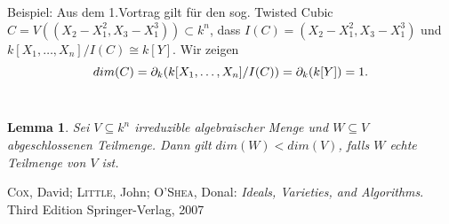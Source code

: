 \documentclass{article}
\newtheorem{lemma}[satz]{Lemma}
\newcommand*{\R}{k[X_{1},\ldots,X_{n}]}
\newcommand*{\indx}[2]{{#1}_{#2}}
\begin{document}
Beispiel: Aus dem 1.Vortrag gilt für den sog. Twisted Cubic $C=V((\indx{X}{2}-\indx{X}{1}^2,\indx{X}{3}-\indx{X}{1}^3))\subset k^n$, dass $I(C)=(\indx{X}{2}-\indx{X}{1}^2,\indx{X}{3}-\indx{X}{1}^3)$ und $\R/I(C)\cong k[Y]$. Wir zeigen
\begin{displaymath}
dim(C)=\indx{\partial}{k}(\R/I(C))=\indx{\partial}{k}(k[Y])=1.\\
\end{displaymath} 
\\

\begin{lemma}
	Sei $V\subseteq k^n$ irreduzible algebraischer Menge und $W\subseteq V$ abgeschlossenen Teilmenge. Dann gilt $dim(W)<dim(V)$, falls $W$ echte Teilmenge von $V$ ist.
\end{lemma} 


\begin{thebibliography}{99}
	\textsc{Cox}, David; \textsc{Little}, John; \textsc{O'Shea}, Donal:
	\newblock \emph{Ideals, Varieties, and Algorithms}.
	\newblock Third Edition
	\newblock Springer-Verlag, 2007
\end{thebibliography}
\end{document}

